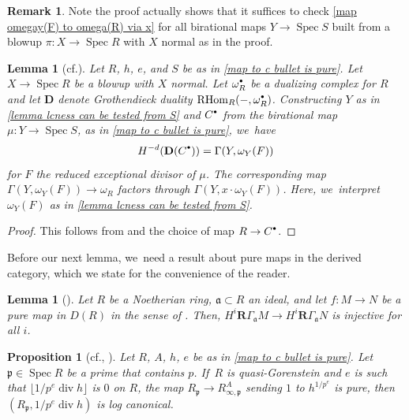 \documentclass[11pt]{article}
\newcommand{\cf}{cf.\xspace}
\let\autoref\cref
\newcommand{\sbullet}{{\scriptscriptstyle\bullet}}
\newcommand{\csbullet}{{\raisebox{1pt}{$\sbullet$}}}
\theoremstyle{plain}
\newtheorem{proposition}[theorem]{Proposition}
\newtheorem{lemma}[theorem]{Lemma}
\theoremstyle{definition}
\newtheorem{remark}[theorem]{Remark}
\numberwithin{equation}{theorem}
\newcommand{\fra}{\mathfrak{a}}
\newcommand{\p}{\mathfrak{p}}
\DeclareMathOperator{\Div}{{div}}
\DeclareMathOperator{\RHom}{RHom}
\DeclareMathOperator{\Spec}{{Spec}}
\newcommand{\unpe}{{1/{p^e}}}
\begin{document}
\begin{remark}\label{rk weaker assumptions for lcness from S}
Note the proof actually shows that it suffices to check \autoref{map omegay(F) to omega(R) via x} for all birational maps $Y\to \Spec S$ built from a blowup $\pi\colon X\to \Spec R$ with $X$ normal as in the proof.
\end{remark}

\begin{lemma}[{\cf \cite[Claim\,5.5]{BMPSTWWPerfectoidPure}}]\label{bottom coh of C bullet}
Let $R$, $h$, $e$, and $S$ be as in \autoref{map to c bullet is pure}.
Let $X\to \Spec R$ be a blowup with $X$ normal. Let $\omega_R^\csbullet$ be a dualizing complex for $R$ and let $\mathbf{D}$ denote Grothendieck duality $\RHom_R(-,\omega_R^\csbullet)$.
Constructing $Y$ as in \autoref{lemma lcness can be tested from S} and $C^\csbullet$ from the birational map $\mu\colon Y\to \Spec S$, as in \autoref{map to c bullet is pure}, we~have
\[H^{-d}(\mathbf{D}(C^\csbullet))=\Gamma(Y,\omega_Y(F))\] for $F$ the reduced exceptional divisor of $\mu$.
The corresponding map $\Gamma(Y,\omega_Y(F) )\to \omega_R$ factors through $\Gamma(Y,x\cdot \omega_Y(F))$. Here, we~interpret $\omega_Y(F)$ as in \autoref{lemma lcness can be tested from S}.
\end{lemma}

\begin{proof}
This follows from \cite[Claim\,5.5]{BMPSTWWPerfectoidPure} and the choice of map $R\to C^\csbullet$.
\end{proof}

Before our next lemma, we~need a result about pure maps in the derived category, which we state for the convenience of the reader.

\begin{lemma}[{\cite[Prop.\,2.11]{BMPSTWWPerfectoidPure}}]\label{pure implies inj on coh}
Let $R$ be a Noetherian ring, $\fra\subset R$ an ideal, and let $f\colon M\to N$ be a pure map in $D(R)$ in the sense of \cite[\S 2.1]{BMPSTWWPerfectoidPure}. Then, $H^i \mathbf{R}\Gamma_\fra M\to H^i \mathbf{R}\Gamma_\fra N$ is injective for all $i$.
\end{lemma}

\begin{proposition}[{\cf \cite[Prop.\,5.4]{BMPSTWWPerfectoidPure}, \cite{KovacsSchwedeSmithLCImpliesDuBois}}]\label{lc implies log canonical p in p}
Let $R$, $A$, $h$, $e$ be as in \autoref{map to c bullet is pure}. Let $\p\in \Spec R$ be a prime that contains $p$. If~$R$ is quasi-Gorenstein and $e$ is such that $\lfloor \unpe\Div h \rfloor$ is $0$ on $R$, the map $R_\p\to R^A_{\infty,\p}$ sending $1$ to $h^\unpe$ is pure, then $(R_\p,\unpe \Div h)$ is log canonical.
\end{proposition}
\end{document}
